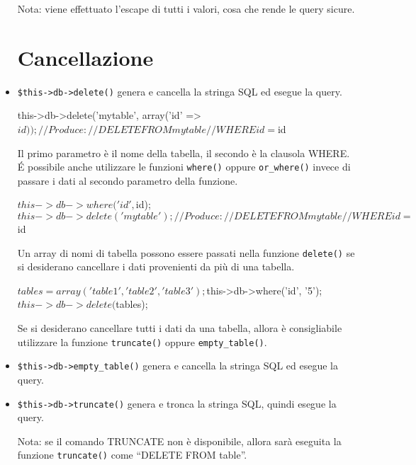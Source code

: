 \begin{itemize}
Nota: viene effettuato l'escape di tutti i valori, cosa che rende le query sicure.

\section*{Cancellazione}
\item \verb|$this->db->delete()| genera e cancella la stringa SQL ed esegue la query.

\begin{code}
this->db->delete('mytable', array('id' => $id)); 

// Produce:
// DELETE FROM mytable 
// WHERE id = $id
\end{code}

Il primo parametro è il nome della tabella, il secondo è la clausola WHERE. \'E possibile anche utilizzare le funzioni \verb|where()| oppure \verb|or_where()| invece di passare i dati al secondo parametro della funzione.

\begin{code}
$this->db->where('id', $id);
$this->db->delete('mytable'); 

// Produce:
// DELETE FROM mytable 
// WHERE id = $id
\end{code}

Un array di nomi di tabella possono essere passati nella funzione \verb|delete()| se si desiderano cancellare i dati provenienti da più di una tabella.

\begin{code}
$tables = array('table1', 'table2', 'table3');
$this->db->where('id', '5');
$this->db->delete($tables);
\end{code}

Se si desiderano cancellare tutti i dati da una tabella, allora è consigliabile utilizzare la funzione \verb|truncate()| oppure \verb|empty_table()|.

\item \verb|$this->db->empty_table()| genera e cancella la stringa SQL ed esegue la query.


\item \verb|$this->db->truncate()| genera e tronca la stringa SQL, quindi esegue la query.


Nota: se il comando TRUNCATE non è disponibile, allora sarà eseguita la funzione \verb|truncate()|  come ``DELETE FROM table''.

\end{itemize}


